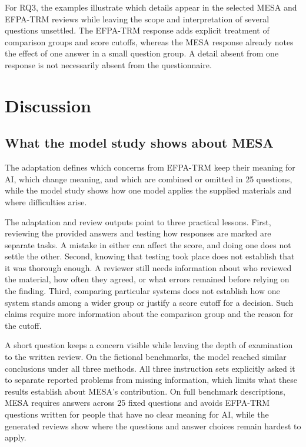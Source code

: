 \documentclass[10pt,conference]{IEEEtran}
\begin{document}
For RQ3, the examples illustrate which details appear in the selected MESA and EFPA-TRM reviews while leaving the scope and interpretation of several questions unsettled. The EFPA-TRM response adds explicit treatment of comparison groups and score cutoffs, whereas the MESA response already notes the effect of one answer in a small question group. A detail absent from one response is not necessarily absent from the questionnaire.

\section{Discussion}
\subsection{What the model study shows about MESA}
The adaptation defines which concerns from EFPA-TRM keep their meaning for AI, which change meaning, and which are combined or omitted in 25 questions, while the model study shows how one model applies the supplied materials and where difficulties arise.

The adaptation and review outputs point to three practical lessons. First, reviewing the provided answers and testing how responses are marked are separate tasks. A mistake in either can affect the score, and doing one does not settle the other. Second, knowing that testing took place does not establish that it was thorough enough. A reviewer still needs information about who reviewed the material, how often they agreed, or what errors remained before relying on the finding. Third, comparing particular systems does not establish how one system stands among a wider group or justify a score cutoff for a decision. Such claims require more information about the comparison group and the reason for the cutoff.

A short question keeps a concern visible while leaving the depth of examination to the written review. On the fictional benchmarks, the model reached similar conclusions under all three methods. All three instruction sets explicitly asked it to separate reported problems from missing information, which limits what these results establish about MESA's contribution. On full benchmark descriptions, MESA requires answers across 25 fixed questions and avoids EFPA-TRM questions written for people that have no clear meaning for AI, while the generated reviews show where the questions and answer choices remain hardest to apply.
\end{document}
